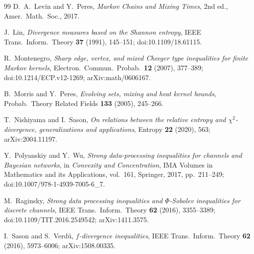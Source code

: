 \documentclass[11pt]{article}
\begin{document}
\begin{thebibliography}{99}
D.~A.~Levin and Y.~Peres,
\emph{Markov Chains and Mixing Times},
2nd ed., Amer.\ Math.\ Soc., 2017.

J.~Lin,
\emph{Divergence measures based on the Shannon entropy},
IEEE Trans.\ Inform.\ Theory \textbf{37} (1991), 145--151;
doi:10.1109/18.61115.

R.~Montenegro,
\emph{Sharp edge, vertex, and mixed Cheeger type inequalities for finite
Markov kernels},
Electron.\ Commun.\ Probab.\ \textbf{12} (2007), 377--389;
doi:10.1214/ECP.v12-1269; arXiv:math/0606167.

B.~Morris and Y.~Peres,
\emph{Evolving sets, mixing and heat kernel bounds},
Probab.\ Theory Related Fields \textbf{133} (2005), 245--266.

T.~Nishiyama and I.~Sason,
\emph{On relations between the relative entropy and
\(\chi^2\)-divergence, generalizations and applications},
Entropy \textbf{22} (2020), 563;
arXiv:2004.11197.

Y.~Polyanskiy and Y.~Wu,
\emph{Strong data-processing inequalities for channels and Bayesian
networks},
in \emph{Convexity and Concentration}, IMA Volumes in Mathematics and its
Applications, vol.~161, Springer, 2017, pp.~211--249;
doi:10.1007/978-1-4939-7005-6\_7.

M.~Raginsky,
\emph{Strong data processing inequalities and
\(\Phi\)-Sobolev inequalities for discrete channels},
IEEE Trans.\ Inform.\ Theory \textbf{62} (2016), 3355--3389;
doi:10.1109/TIT.2016.2549542; arXiv:1411.3575.

I.~Sason and S.~Verd\'u,
\emph{\(f\)-divergence inequalities},
IEEE Trans.\ Inform.\ Theory \textbf{62} (2016), 5973--6006;
arXiv:1508.00335.

\end{thebibliography}
\end{document}
